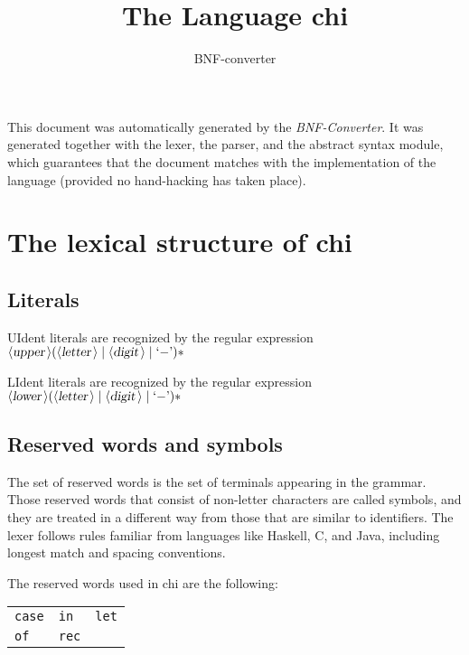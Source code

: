 \documentclass[a4paper,11pt]{article}
\author{BNF-converter}
\title{The Language chi}
\begin{document}
\maketitle

\newcommand{\emptyP}{\mbox{$\epsilon$}}
\newcommand{\terminal}[1]{\mbox{{\texttt {#1}}}}
\newcommand{\nonterminal}[1]{\mbox{$\langle \mbox{{\sl #1 }} \! \rangle$}}
\newcommand{\arrow}{\mbox{::=}}
\newcommand{\delimit}{\mbox{$|$}}
\newcommand{\reserved}[1]{\mbox{{\texttt {#1}}}}
\newcommand{\literal}[1]{\mbox{{\texttt {#1}}}}
\newcommand{\symb}[1]{\mbox{{\texttt {#1}}}}

This document was automatically generated by the {\em BNF-Converter}. It was generated together with the lexer, the parser, and the abstract syntax module, which guarantees that the document matches with the implementation of the language (provided no hand-hacking has taken place).

\section*{The lexical structure of chi}

\subsection*{Literals}



UIdent literals are recognized by the regular expression
\({\nonterminal{upper}} ({\nonterminal{letter}} \mid {\nonterminal{digit}} \mid \mbox{`{$-$}'})*\)

LIdent literals are recognized by the regular expression
\({\nonterminal{lower}} ({\nonterminal{letter}} \mid {\nonterminal{digit}} \mid \mbox{`{$-$}'})*\)


\subsection*{Reserved words and symbols}
The set of reserved words is the set of terminals appearing in the grammar. Those reserved words that consist of non-letter characters are called symbols, and they are treated in a different way from those that are similar to identifiers. The lexer follows rules familiar from languages like Haskell, C, and Java, including longest match and spacing conventions.

The reserved words used in chi are the following: \\

\begin{tabular}{lll}
{\reserved{case}} &{\reserved{in}} &{\reserved{let}} \\
{\reserved{of}} &{\reserved{rec}} & \\
\end{tabular}\\
\end{document}

